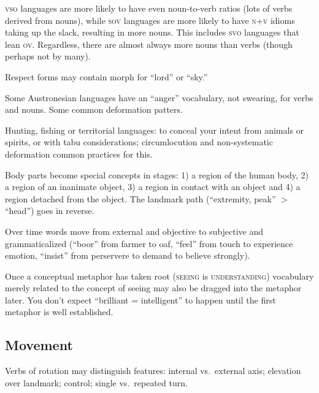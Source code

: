 \documentclass[11pt]{article}
\newcommand{\I}[1]{\textsc{#1}}   %
\begin{document}
\I{vso} languages are more likely to have even noun-to-verb ratios
(lots of verbs derived from nouns), while \I{sov} languages are more
likely to have \I{n+v} idioms taking up the slack, resulting in more
nouns.  This includes \I{svo} languages that lean \I{ov}.  Regardless,
there are almost always more nouns than verbs (though perhaps not by
many).

Respect forms may contain morph for ``lord'' or ``sky.''

Some Austronesian languages have an ``anger'' vocabulary, not
swearing, for verbs and nouns.  Some common deformation patters.

Hunting, fishing or territorial languages: to conceal your intent from
animals or spirits, or with tabu considerations; circumlocution and
non-systematic deformation common practices for this.

Body parts become special concepts in stages: 1) a region of the human
body, 2) a region of an inanimate object, 3) a region in contact with
an object and 4) a region detached from the object.  The landmark path
(``extremity, peak'' $>$ ``head'') goes in reverse.

Over time words move from external and objective to subjective and
grammaticalized (``boor'' from farmer to oaf, ``feel'' from touch to
experience emotion, ``insist'' from perservere to demand to believe
strongly).

Once a conceptual metaphor has taken root (\I{seeing} is
\I{understanding}) vocabulary merely related to the concept of seeing
may also be dragged into the metaphor later.  You don't expect
``brilliant = intelligent'' to happen until the first metaphor is well
established.

\subsection{Movement}
Verbs of rotation may distinguish features: internal vs.\ external
axis; elevation over landmark; control; single vs.\ repeated turn.
\end{document}

